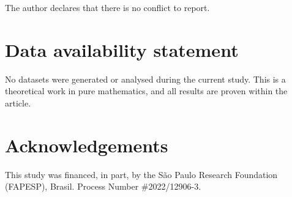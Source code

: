 \documentclass[]{article}
\begin{document}
The author declares that there is no conflict to report.

\section*{Data availability statement}
No datasets were generated or analysed during the current study. This is a theoretical work in pure mathematics, and all results are proven within the article.

\section*{Acknowledgements}

This study was financed, in part, by the São Paulo Research Foundation (FAPESP), Brasil. Process Number \#2022/12906-3.



\end{document}
